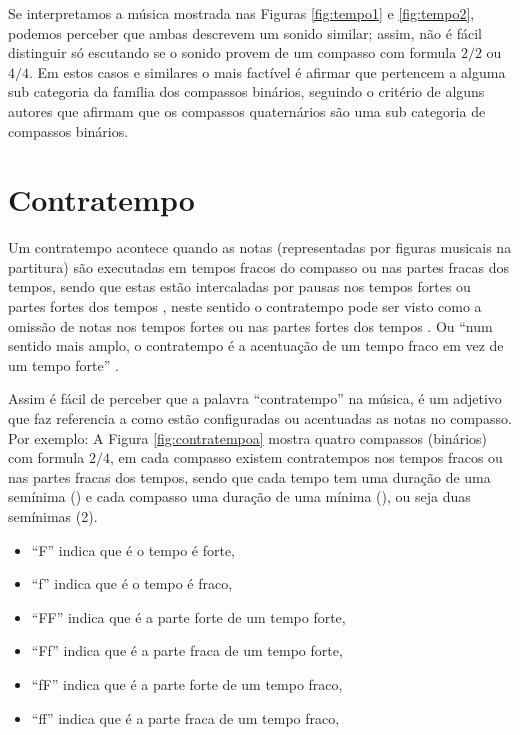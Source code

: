 \begin{lattention}
Se interpretamos a música mostrada nas Figuras \ref{fig:tempo1} e \ref{fig:tempo2},
podemos perceber que ambas descrevem um sonido similar; assim, não é fácil
distinguir só escutando se o sonido provem de um compasso com formula $2/2$ ou $4/4$.
Em estos casos e similares o mais factível é afirmar que pertencem a alguma sub categoria da família dos
compassos binários, seguindo o critério de alguns autores \cite[pp. 41]{grabner2001teoria} que afirmam 
 que os compassos
quaternários são uma sub categoria de compassos binários.
\end{lattention}

\section{Contratempo}
Um contratempo acontece quando as notas (representadas por figuras musicais na partitura) 
são executadas em tempos fracos do compasso
ou nas partes fracas dos tempos, sendo que estas estão intercaladas por pausas nos tempos
fortes ou partes fortes dos tempos \cite[pp. 16]{mascarenhascurso} 
\cite[pp. 36]{azevedocompor}, neste sentido o contratempo pode ser visto como a 
omissão de notas nos tempos fortes ou nas partes fortes dos tempos \cite[pp. 146]{medteoria}.
Ou ``num sentido mais amplo, o contratempo é a acentuação de um tempo fraco em vez de um tempo forte'' \cite[pp. 147]{medteoria}. 

Assim é fácil de perceber que a palavra ``contratempo'' na música, 
é um adjetivo que faz referencia a como estão configuradas ou acentuadas 
as notas no compasso. Por exemplo:
A Figura \ref{fig:contratempoa} mostra 
quatro compassos (binários) com formula $2/4$, em cada compasso existem 
contratempos nos tempos fracos ou nas partes fracas dos tempos, sendo que cada tempo
tem uma duração de uma semínima (\quarternote) e cada compasso uma duração 
de uma mínima (\halfnote), ou seja duas semínimas (2\quarternote). 
\begin{itemize}
\item ``F''  indica que é o tempo é forte, 
\item ``f''  indica que é o tempo é fraco,
\item ``FF'' indica que é a parte forte de um tempo forte,
\item ``Ff'' indica que é a parte fraca de um tempo forte,
\item ``fF'' indica que é a parte forte de um tempo fraco,
\item ``ff'' indica que é a parte fraca de um tempo fraco, 
\end{itemize} 

